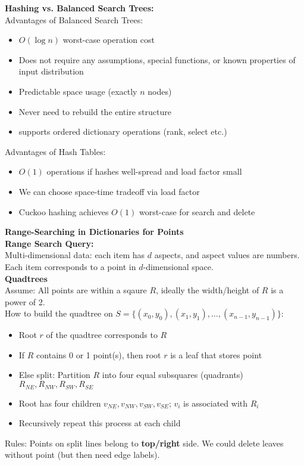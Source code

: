 \documentclass[12pt]{article}
\begin{document}
{\textbf{Hashing vs. Balanced Search Trees:}\\
Advantages of Balanced Search Trees:
\begin{itemize}
	\renewcommand\labelitemi{--}
	\item $O(\log n)$ worst-case operation cost
	\item Does not require any assumptions, special functions, or known properties of input distribution
	\item Predictable space usage (exactly $n$ nodes)
	\item Never need to rebuild the entire structure
	\item supports ordered dictionary operations (rank, select etc.)
\end{itemize}
Advantages of Hash Tables:
\begin{itemize}
	\renewcommand\labelitemi{--}
	\item $O(1)$ operations if hashes well-spread and load factor small
	\item We can choose space-time tradeoff via load factor
	\item Cuckoo hashing achieves $O(1)$ worst-case for search and delete
\end{itemize}

\clearpage
{\Large\bf Range-Searching in Dictionaries for Points}\\

\textbf{Range Search Query:}\\
Multi-dimensional data: each item has $d$ aspects, and aspect values are numbers. Each item corresponds to a point in $d$-dimensional space. \\

\textbf{Quadtrees}\\
Assume: All points are within a sqaure $R$, ideally the width/height of $R$ is a power of 2.\\
How to build the quadtree on $S = \{(x_0, y_0), (x_1,y_1),\dots, (x_{n-1}, y_{n-1}) \}$:
\begin{itemize}
	\renewcommand\labelitemi{--}
	\item Root $r$ of the quadtree corresponds to $R$
	\item If $R$ contains 0 or 1 point(s), then root $r$ is a leaf that stores point
	\item Else split: Partition $R$ into four equal subsquares (quadrants) $R_{NE}, R_{NW}, R_{SW}, R_{SE}$
	\item Root has four children $v_{NE}, v_{NW}, v_{SW}, v_{SE}$; $v_i$ is associated with $R_i$
	\item Recursively repeat this process at each child
\end{itemize}
Rules: Points on split lines belong to \textbf{top/right} side. We could delete leaves without point (but then need edge labels).\\

}
\end{document}
